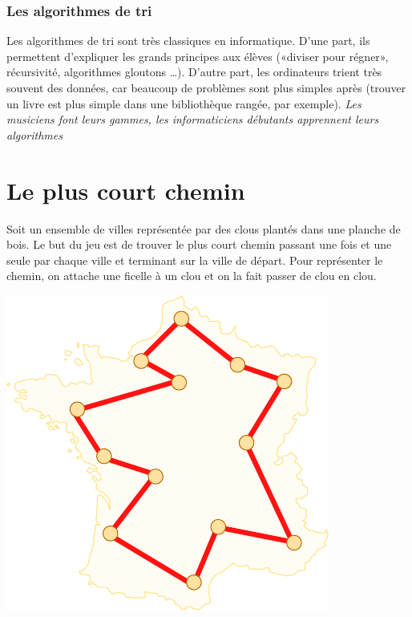\documentclass[a5paper,pagesize,DIV=14]{scrbook}
\begin{document}
\subsection*{Les algorithmes de tri}

Les algorithmes de tri sont très classiques en informatique. D'une part, ils permettent d'expliquer les grands principes aux élèves («diviser pour régner», récursivité, algorithmes gloutons \ldots). D'autre part, les ordinateurs trient très souvent des données, car beaucoup de problèmes sont plus simples après (trouver un livre est plus simple dans une bibliothèque rangée, par exemple). \textit{Les musiciens font leurs gammes, les informaticiens débutants apprennent leurs algorithmes}



\chapter*{Le plus court chemin}

Soit un ensemble de villes représentée par des clous plantés dans une planche de bois. Le but du jeu est de trouver le plus court chemin passant une fois et une seule par chaque ville et terminant sur la ville de départ. Pour représenter le chemin, on attache une ficelle à un clou et on la fait passer de clou en clou.

\begin{center}
  \includegraphics[width=0.5\linewidth]{img/tsp.pdf}
  \label{img:tsp}
\end{center}
\end{document}
